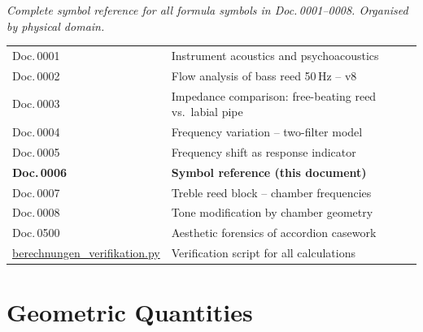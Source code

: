 \documentclass[11pt,a4paper]{article}
\begin{document}
\hbmaketitle

{\small\itshape Complete symbol reference for all formula symbols in Doc.\,0001--0008. Organised by physical domain.}

\vspace{2mm}
\begin{center}\small
\begin{tabularx}{\textwidth}{l X}
\hbtoprule
Doc.\,0001 & Instrument acoustics and psychoacoustics \\
Doc.\,0002 & Flow analysis of bass reed 50\,Hz -- v8 \\
Doc.\,0003 & Impedance comparison: free-beating reed vs.\ labial pipe \\
Doc.\,0004 & Frequency variation -- two-filter model \\
Doc.\,0005 & Frequency shift as response indicator \\
\textbf{Doc.\,0006} & \textbf{Symbol reference (this document)} \\
Doc.\,0007 & Treble reed block -- chamber frequencies \\
Doc.\,0008 & Tone modification by chamber geometry \\
Doc.\,0500 & Aesthetic forensics of accordion casework \\
\midrule
\href{berechnungen_verifikation.py}{berechnungen\_verifikation.py} & Verification script for all calculations \\
\bottomrule
\end{tabularx}
\end{center}
\vspace{4mm}

\section{Geometric Quantities}
\end{document}
